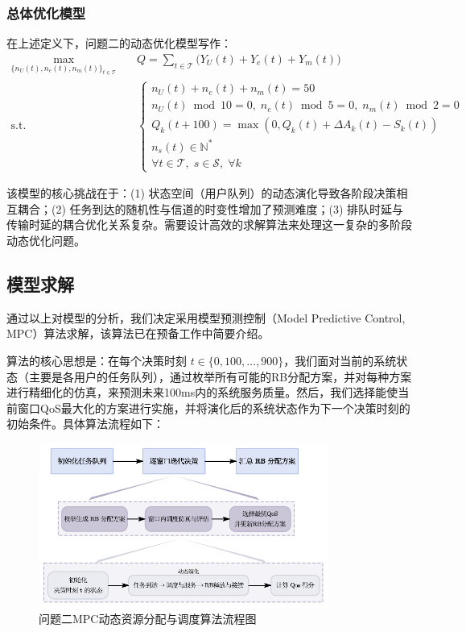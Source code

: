 \subsubsection{总体优化模型}
在上述定义下，问题二的动态优化模型写作：
\begin{equation}
\label{eq:q2_obj}
\begin{aligned}
\max_{\{n_U(t),n_e(t),n_m(t)\}_{t\in\mathcal{T}}}\quad & Q=\sum_{t\in\mathcal{T}}\Big( Y_U(t)+Y_e(t)+Y_m(t) \Big) \\
\text{s.t.} \quad & \begin{cases}
  n_U(t) + n_e(t) + n_m(t) = 50\\
  n_U(t) \bmod 10 = 0,\; n_e(t) \bmod 5 = 0,\; n_m(t) \bmod 2 = 0\\
  Q_k(t+100) = \max\!\left(0, Q_k(t) + \Delta A_k(t) - S_k(t)\right) \\
  n_s(t) \in \mathbb{N}^* \\
  \forall t \in \mathcal{T},\;s \in \mathcal{S},\; \forall k
  \end{cases}
  \end{aligned}
\end{equation}

该模型的核心挑战在于：(1) 状态空间（用户队列）的动态演化导致各阶段决策相互耦合；(2) 任务到达的随机性与信道的时变性增加了预测难度；(3) 排队时延与传输时延的耦合优化关系复杂。需要设计高效的求解算法来处理这一复杂的多阶段动态优化问题。

\subsection{模型求解}

通过以上对模型的分析，我们决定采用模型预测控制（Model Predictive Control, MPC）算法求解，该算法已在预备工作中简要介绍。

算法的核心思想是：在每个决策时刻 $t \in \{0, 100, \dots, 900\}$，我们面对当前的系统状态（主要是各用户的任务队列），通过枚举所有可能的RB分配方案，并对每种方案进行精细化的仿真，来预测未来100ms内的系统服务质量。然后，我们选择能使当前窗口QoS最大化的方案进行实施，并将演化后的系统状态作为下一个决策时刻的初始条件。具体算法流程如下：
\begin{figure}[H]
    \centering
    \includegraphics[width=0.85\textwidth]{figures/第二问算法.pdf}
    \caption{问题二MPC动态资源分配与调度算法流程图}
    \label{fig:q2_algorithm_flow}
\end{figure}

